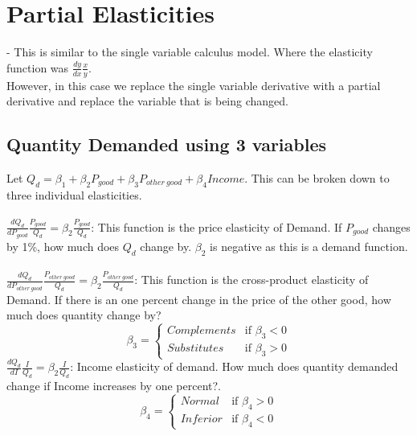 \documentclass{book}
\begin{document}
    \section{Partial Elasticities}
    - This is similar to the single variable calculus model.
    Where the elasticity function was $\frac{dy}{dx} \frac{x}{y}$.\\
    However, in this case we replace the single variable derivative with a partial derivative and replace the variable that is being changed.
    \subsection{Quantity Demanded using 3 variables}
    Let $Q_d = \beta_1 + \beta_2 P_{good} + \beta_3 P_{other\ good} + \beta_4 Income$.
    This can be broken down to three individual elasticities.\\\\
    $\frac{dQ_d}{dP_{good}} \frac{P_{good}}{Q_d} = \beta_2 \frac{P_{good}}{Q_d}$: This function is the price elasticity of Demand. If $P_{good}$ changes by 1\%, how much does $Q_d$ change by. $\beta_2$ is negative as this is a demand function.\\\\
    $\frac{dQ_d}{dP_{other\ good}} \frac{P_{other\ good}}{Q_d} = \beta_2 \frac{P_{other\ good}}{Q_d}$: This function is the cross-product elasticity of Demand. If there is an one percent change in the price of the other good, how much does quantity change by?\\
    \[ 
        \beta_3 = 
        \begin{cases}
            Complements & \text{if $\beta_3 < 0$}\\
            Substitutes & \text{if $\beta_3 > 0$}
        \end{cases}   
    \]
    $\frac{dQ_d}{dI} \frac{I}{Q_d} = \beta_2 \frac{I}{Q_d}$: Income elasticity of demand. How much does quantity demanded change if Income increases by one percent?.\\
    \[
    \beta_4 =
    \begin{cases}
        Normal & \text{if $\beta_4 > 0$}\\
        Inferior & \text{if $\beta_4 < 0$}
    \end{cases}    
    \]   
    \pagebreak
\end{document}

